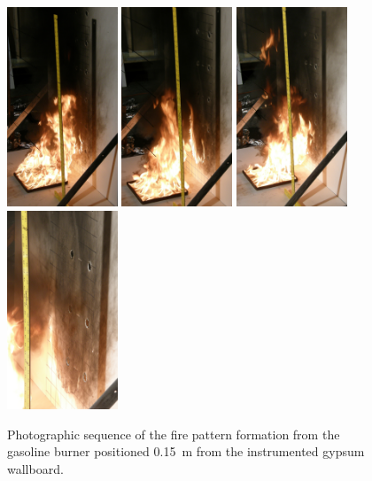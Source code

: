 \documentclass[twoside]{uocthesis}
\begin{document}
\begin{figure}[p]
	\includegraphics[width=1.3in]{../Figures/IWGBGAS6_Seq5}
	\includegraphics[width=1.3in]{../Figures/IWGBGAS6_Seq6}
	\includegraphics[width=1.3in]{../Figures/IWGBGAS6_Seq7}
	\includegraphics[width=1.3in]{../Figures/IWGBGAS6_Seq8} \\

	\caption[Photographs of the fire pattern formation from the gasoline burner positioned 0.15~m from the wall]{Photographic sequence of the fire pattern formation from the gasoline burner positioned 0.15~m from the instrumented gypsum wallboard.}
	\label{IWGBGAS6_seq}
\end{figure}
\end{document}
